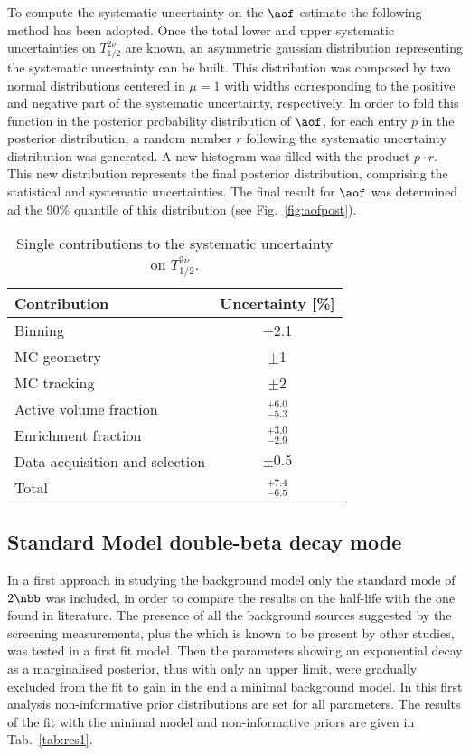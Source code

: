 To compute the systematic uncertainty on the $\aof$ estimate the following method has been adopted. Once the total lower and upper systematic uncertainties on $T_{1/2}^{2\nu}$ are known, an asymmetric gaussian distribution representing the systematic uncertainty can be built. This distribution was composed by two normal distributions centered in $\mu=1$ with widths corresponding to the positive and negative part of the systematic uncertainty, respectively. In order to fold this function in the posterior probability distribution of $\aof$, for each entry $p$ in the posterior distribution, a random number $r$ following the systematic uncertainty distribution was generated. A new histogram was filled with the product $p\cdot r$. This new distribution represents the final posterior distribution, comprising the statistical and systematic uncertainties. The final result for $\aof$ was determined ad the 90\% quantile of this distribution (see Fig.~\ref{fig:aofpost}).
\begin{table}
	\centering
	\caption{Single contributions to the systematic uncertainty on $T_{1/2}^{2\nu}.$}\label{tab:sys}
	{\renewcommand{\arraystretch}{1.1}
	\begin{tabular}{lc}
			\toprule
			Contribution	&	Uncertainty [\%]	\\
			\midrule
			Binning			&	+2.1	\\
			MC geometry		&	$\pm$1	\\
			MC tracking		&	$\pm$2	\\
			Active volume fraction 	&	$^{+6.0}_{-5.3}$	\\
			Enrichment fraction		&	$^{+3.0}_{-2.9}$	\\
			Data acquisition and selection		&	$\pm0.5$	\\
			\midrule
			Total			&	$^{+7.4}_{-6.5}$	\\
			\bottomrule
	\end{tabular}}
\end{table}
\subsection*{Standard Model double-beta decay mode}
In a first approach in studying the background model only the standard mode of $2\nbb$ was included, in order to compare the results on the half-life with the one found in literature. The presence of all the background sources suggested by the screening measurements, plus the  which is known to be present by other studies, was tested in a first fit model. Then the parameters showing an exponential decay as a marginalised posterior, thus with only an upper limit, were gradually excluded from the fit to gain in the end a minimal background model. In this first analysis non-informative prior distributions are set for all parameters. The results of the fit with the minimal model and non-informative priors are given in Tab.~\ref{tab:res1}.

